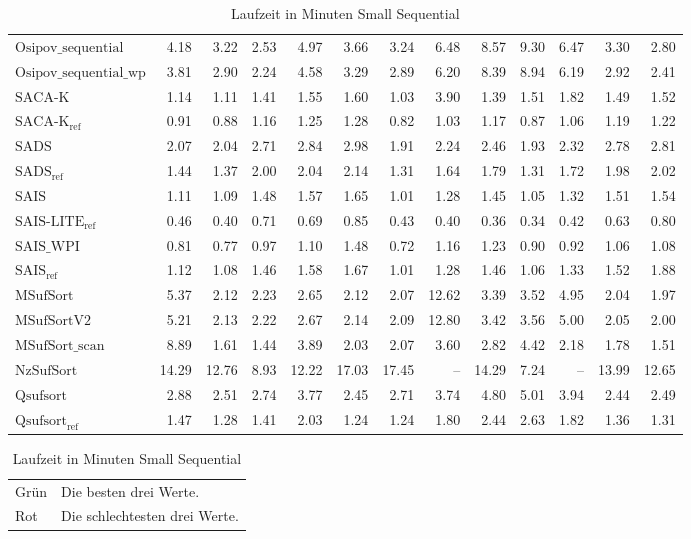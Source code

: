 \begin{table}[ht]
{\begin{tabular}{lrrrrrrrrrrrr}
    $\text{Osipov\_sequential}$ & 4.18 & 3.22 & 2.53 & 4.97 & 3.66 & 3.24 & 6.48 & 8.57 & 9.30 & 6.47 & 3.30 & 2.80 \\
    $\text{Osipov\_sequential\_wp}$ & 3.81 & 2.90 & 2.24 & 4.58 & 3.29 & 2.89 & 6.20 & 8.39 & 8.94 & 6.19 & 2.92 & 2.41 \\
    $\text{SACA-K}$ & 1.14 & 1.11 & 1.41 & 1.55 & 1.60 & 1.03 & 3.90 & 1.39 & 1.51 & 1.82 & 1.49 & 1.52 \\
    $\text{SACA-K}_{\text{ref}}$ & 0.91 & 0.88 & 1.16 & 1.25 & 1.28 & 0.82 & 1.03 & 1.17 & 0.87 & 1.06 & 1.19 & 1.22 \\
    $\text{SADS}$ & 2.07 & 2.04 & 2.71 & 2.84 & 2.98 & 1.91 & 2.24 & 2.46 & 1.93 & 2.32 & 2.78 & 2.81 \\
    $\text{SADS}_{\text{ref}}$ & 1.44 & 1.37 & 2.00 & 2.04 & 2.14 & 1.31 & 1.64 & 1.79 & 1.31 & 1.72 & 1.98 & 2.02 \\
    $\text{SAIS}$ & 1.11 & 1.09 & 1.48 & 1.57 & 1.65 & 1.01 & 1.28 & 1.45 & 1.05 & 1.32 & 1.51 & 1.54 \\
    $\text{SAIS-LITE}_{\text{ref}}$ & {\color{green!60!black}0.46} & {\color{green!60!black}0.40} & 0.71 & 0.69 & 0.85 & {\color{green!60!black}0.43} & {\color{green!60!black}0.40} & {\color{green!60!black}0.36} & {\color{green!60!black}0.34} & {\color{green!60!black}0.42} & 0.63 & 0.80 \\
    $\text{SAIS\_WPI}$ & 0.81 & 0.77 & 0.97 & 1.10 & 1.48 & 0.72 & 1.16 & 1.23 & 0.90 & 0.92 & 1.06 & 1.08 \\
    $\text{SAIS}_{\text{ref}}$ & 1.12 & 1.08 & 1.46 & 1.58 & 1.67 & 1.01 & 1.28 & 1.46 & 1.06 & 1.33 & 1.52 & 1.88 \\
    $\text{MSufSort}$ & 5.37 & 2.12 & 2.23 & 2.65 & 2.12 & 2.07 & {\color{red}12.62} & 3.39 & 3.52 & 4.95 & 2.04 & 1.97 \\
    $\text{MSufSortV2}$ & 5.21 & 2.13 & 2.22 & 2.67 & 2.14 & 2.09 & {\color{red}12.80} & 3.42 & 3.56 & 5.00 & 2.05 & 2.00 \\
    $\text{MSufSort\_scan}$ & 8.89 & 1.61 & 1.44 & 3.89 & 2.03 & 2.07 & 3.60 & 2.82 & 4.42 & 2.18 & 1.78 & 1.51 \\
    $\text{NzSufSort}$ & {\color{red}14.29} & {\color{red}12.76} & {\color{red}8.93} & 12.22 & {\color{red}17.03} & {\color{red}17.45} & {\color{darkgray}--} & 14.29 & 7.24 & {\color{darkgray}--} & {\color{red}13.99} & {\color{red}12.65} \\
    $\text{Qsufsort}$ & 2.88 & 2.51 & 2.74 & 3.77 & 2.45 & 2.71 & 3.74 & 4.80 & 5.01 & 3.94 & 2.44 & 2.49 \\
    $\text{Qsufsort}_{\text{ref}}$ & 1.47 & 1.28 & 1.41 & 2.03 & 1.24 & 1.24 & 1.80 & 2.44 & 2.63 & 1.82 & 1.36 & 1.31 \\
\bottomrule
\end{tabular}
}
\caption{Laufzeit in Minuten Small Sequential}
\label{messung:tab:time-small-seq-none}
\begin{tabular}{ll}
{\color{green}Grün} & Die besten drei Werte.\\
{\color{red}Rot} & Die schlechtesten drei Werte.\\
\end{tabular}
\end{table}
